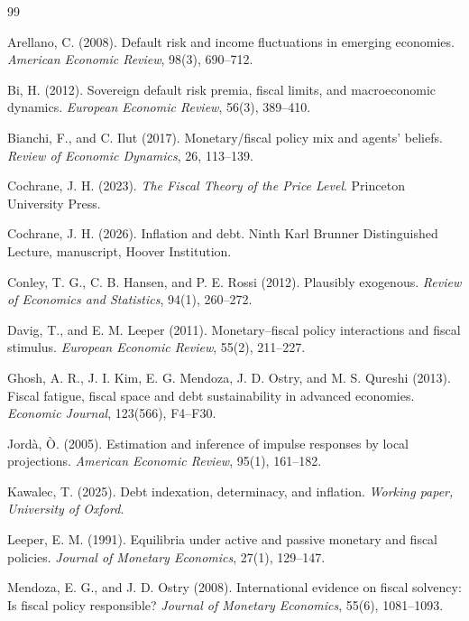 \documentclass[12pt,a4paper]{article}
\begin{document}
\begin{thebibliography}{99}

Arellano, C. (2008).
Default risk and income fluctuations in emerging economies.
\emph{American Economic Review}, 98(3), 690--712.

Bi, H. (2012).
Sovereign default risk premia, fiscal limits, and macroeconomic dynamics.
\emph{European Economic Review}, 56(3), 389--410.

Bianchi, F., and C. Ilut (2017).
Monetary/fiscal policy mix and agents' beliefs.
\emph{Review of Economic Dynamics}, 26, 113--139.

Cochrane, J. H. (2023).
\emph{The Fiscal Theory of the Price Level}.
Princeton University Press.

Cochrane, J. H. (2026).
Inflation and debt.
Ninth Karl Brunner Distinguished Lecture, manuscript, Hoover Institution.


Conley, T. G., C. B. Hansen, and P. E. Rossi (2012).
Plausibly exogenous.
\emph{Review of Economics and Statistics}, 94(1), 260--272.

Davig, T., and E. M. Leeper (2011).
Monetary--fiscal policy interactions and fiscal stimulus.
\emph{European Economic Review}, 55(2), 211--227.

Ghosh, A. R., J. I. Kim, E. G. Mendoza, J. D. Ostry, and M. S. Qureshi (2013).
Fiscal fatigue, fiscal space and debt sustainability in advanced economies.
\emph{Economic Journal}, 123(566), F4--F30.

Jordà, Ò. (2005).
Estimation and inference of impulse responses by local projections.
\emph{American Economic Review}, 95(1), 161--182.

Kawalec, T. (2025).
Debt indexation, determinacy, and inflation.
\emph{Working paper, University of Oxford.}


Leeper, E. M. (1991).
Equilibria under active and passive monetary and fiscal policies.
\emph{Journal of Monetary Economics}, 27(1), 129--147.

Mendoza, E. G., and J. D. Ostry (2008).
International evidence on fiscal solvency: Is fiscal policy responsible?
\emph{Journal of Monetary Economics}, 55(6), 1081--1093.


\end{thebibliography}
\end{document}
